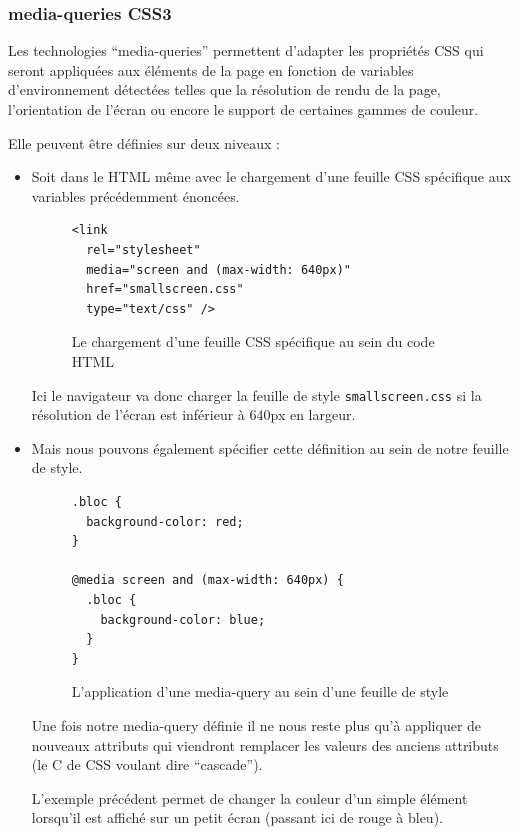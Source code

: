 \documentclass[12pt,a4paper]{book}
\begin{document}
\subsubsection{media-queries CSS3}

Les technologies ``media-queries'' permettent d'adapter les propriétés CSS qui seront appliquées aux éléments de la page en fonction de variables d'environnement détectées telles que la résolution de rendu de la page, l'orientation de l'écran ou encore le support de certaines gammes de couleur.

Elle peuvent être définies sur deux niveaux :
\begin{itemize}
  \item Soit dans le HTML même avec le chargement d'une feuille CSS spécifique aux variables précédemment énoncées.
  \begin{figure}[h]
  \lstset{language=html}
  \begin{lstlisting}
<link 
  rel="stylesheet" 
  media="screen and (max-width: 640px)" 
  href="smallscreen.css" 
  type="text/css" />
  \end{lstlisting}
   \caption{Le chargement d'une feuille CSS spécifique au sein du code HTML}
   \label{fig.sort3}
  \end{figure}
  
    Ici le navigateur va donc charger la feuille de style \texttt{smallscreen.css} si la résolution de l'écran est inférieur à 640px en largeur.
  \item Mais nous pouvons également spécifier cette définition au sein de notre feuille de style.
  
  \begin{figure}[h]
  \lstset{language=html}
  \begin{lstlisting}
.bloc {
  background-color: red;
}
  
@media screen and (max-width: 640px) {
  .bloc {
    background-color: blue;
  }
}
  \end{lstlisting}
   \caption{L'application d'une media-query au sein d'une feuille de style}
   \label{fig.sort3}
  \end{figure}
  
  Une fois notre media-query définie il ne nous reste plus qu'à appliquer de nouveaux attributs qui viendront remplacer les valeurs des anciens attributs (le C de CSS voulant dire ``cascade'').
  
  L'exemple précédent permet de changer la couleur d'un simple élément lorsqu'il est affiché sur un petit écran (passant ici de rouge à bleu).

\end{itemize}
\end{document}
